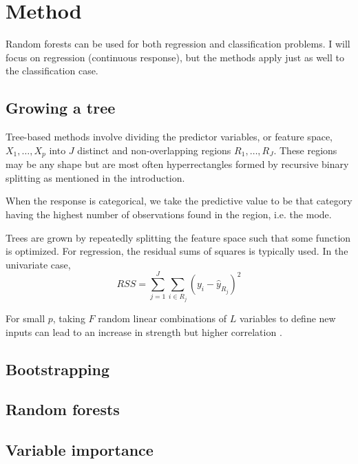 \section{Method}

Random forests can be used for both regression and classification problems. I will focus on regression (continuous response), but the methods apply just as well to the classification case.

\subsection{Growing a tree}

Tree-based methods involve dividing the predictor variables, or feature space, $X_1,\ldots,X_p$ into $J$ distinct and non-overlapping regions $R_1,\ldots,R_J$. These regions may be any shape but are most often hyperrectangles formed by recursive binary splitting as mentioned in the introduction.

When the response is categorical, we take the predictive value to be that category having the highest number of observations found in the region, i.e. the mode.

Trees are grown by repeatedly splitting the feature space such that some function is optimized. For regression, the residual sums of squares is typically used. In the univariate case,
\[ RSS=\sum_{j=1}^J\sum_{i\in R_j}(y_i - \hat{y}_{R_j})^2 \]



For small $p$, taking $F$ random linear combinations of $L$ variables to define new inputs can lead to an increase in strength but higher correlation \citep{breiman:2001}. \cite{segal:2011} \cite{death:2002}

\subsection{Bootstrapping}


\subsection{Random forests}


\subsection{Variable importance}
